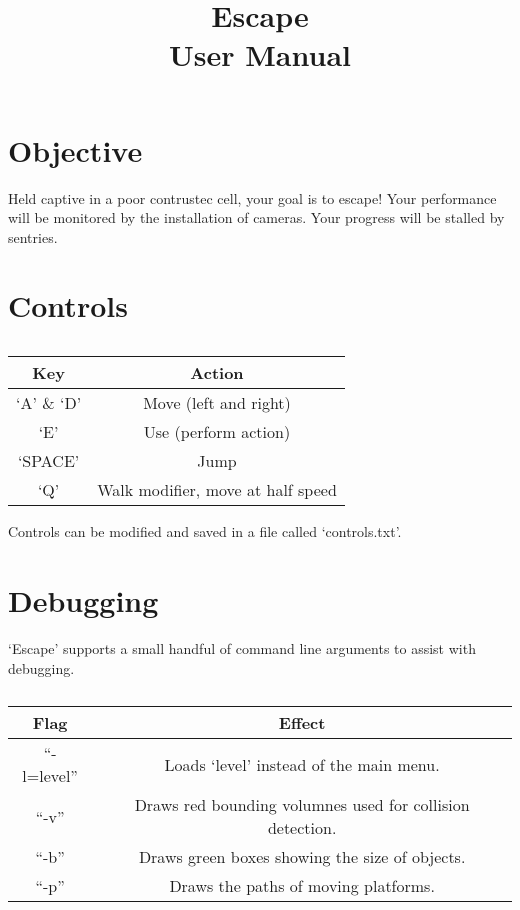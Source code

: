 \documentclass[english]{article}
\title{Escape\\ User Manual}
\author{} %
\date{} %
\begin{document}
\maketitle
\tableofcontents
\section{Objective}
Held captive in a poor contrustec cell, your goal is to escape!
Your performance will be monitored by the installation of cameras.
Your progress will be stalled by sentries.

\section{Controls}
\begin{table}[!h]
\caption*{}
\label{tab:control}
\begin{tabular}{|c|c|}
\hline
Key & Action \\
\hline
`A' \& `D' & Move (left and right) \\
\hline
`E' & Use (perform action) \\
\hline
`SPACE' & Jump \\
\hline
`Q' & Walk modifier, move at half speed \\
\hline
\end{tabular}
\end{table}
Controls can be modified and saved in a file called `controls.txt'.

\section{Debugging}
`Escape' supports a small handful of command line arguments to assist with debugging.

\begin{table}[!h]
\caption*{}
\label{tab:control}
\begin{tabular}{|c|c|}
\hline
Flag & Effect \\
\hline
``-l=level'' & Loads `level' instead of the main menu. \\
\hline
``-v'' & Draws red bounding volumnes used for collision detection. \\
\hline
``-b'' & Draws green boxes showing the size of objects. \\
\hline
``-p'' & Draws the paths of moving platforms. \\
\hline
\end{tabular}
\end{table}
\end{document}
